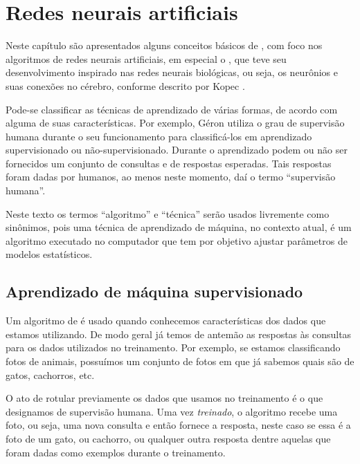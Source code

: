 
\chapter{Redes neurais artificiais}
\label{cap:redes}

Neste capítulo são apresentados alguns conceitos básicos de , com foco nos algoritmos de redes neurais artificiais, em especial o , que teve seu desenvolvimento inspirado nas redes neurais biológicas, ou seja, os neurônios e suas conexões no cérebro, conforme descrito por Kopec \citep{classic}.

Pode-se classificar as técnicas de aprendizado de várias formas, de acordo com alguma de suas características. Por exemplo, Géron \citep{hands} utiliza o grau de supervisão humana durante o seu funcionamento para classificá-los em aprendizado supervisionado ou não-supervisionado. Durante o aprendizado podem ou não ser fornecidos um conjunto de consultas e de respostas esperadas. Tais respostas foram dadas por humanos, ao menos neste momento, daí o termo ``supervisão humana''.

Neste texto os termos ``algoritmo'' e ``técnica'' serão usados livremente como sinônimos, pois uma técnica de aprendizado de máquina, no contexto atual, é um algoritmo executado no computador que tem por objetivo ajustar parâmetros de modelos estatísticos.

\section{Aprendizado de máquina supervisionado}

 Um algoritmo de  é usado quando conhecemos características dos dados que estamos utilizando. De modo geral já temos de antemão as respostas às consultas para os dados utilizados no treinamento. Por exemplo, se estamos classificando fotos de animais, possuímos um conjunto de fotos em que já sabemos quais são de gatos, cachorros, etc.

 O ato de rotular previamente os dados que usamos no treinamento é o que designamos de supervisão humana. Uma vez \emph{treinado}, o algoritmo recebe uma foto, ou seja, uma nova consulta e então fornece a resposta, neste caso se essa é a foto de um gato, ou cachorro, ou qualquer outra resposta dentre aquelas que foram dadas como exemplos durante o treinamento.


